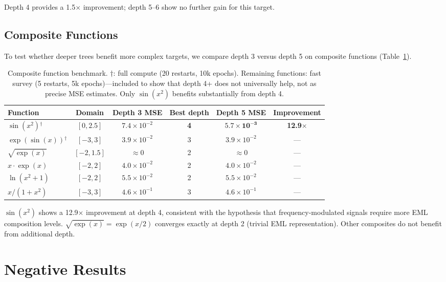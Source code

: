 \documentclass[11pt,a4paper]{article}
\begin{document}
Depth 4 provides a 1.5$\times$ improvement; depth 5--6 show no further gain for this target.

\subsection{Composite Functions}

To test whether deeper trees benefit more complex targets, we compare depth 3 versus depth 5 on composite functions (Table~\ref{tab:composite}).

\begin{table}[ht]
\centering
\caption{Composite function benchmark. $\dagger$: full compute (20 restarts, 10k epochs). Remaining functions: fast survey (5 restarts, 5k epochs)---included to show that depth 4+ does not universally help, not as precise MSE estimates. Only $\sin(x^2)$ benefits substantially from depth 4.}
\label{tab:composite}
\begin{tabular}{lccccc}
\toprule
Function & Domain & Depth 3 MSE & Best depth & Depth 5 MSE & Improvement \\
\midrule
$\sin(x^2)$$^\dagger$ & $[0, 2.5]$ & $7.4 \times 10^{-2}$ & \textbf{4} & $\mathbf{5.7 \times 10^{-3}}$ & \textbf{12.9$\times$} \\
$\exp(\sin(x))$$^\dagger$ & $[-3, 3]$ & $3.9 \times 10^{-2}$ & 3 & $3.9 \times 10^{-2}$ & --- \\
$\sqrt{\exp(x)}$ & $[-2, 1.5]$ & $\approx 0$ & 2 & $\approx 0$ & --- \\
$x \cdot \exp(x)$ & $[-2, 2]$ & $4.0 \times 10^{-2}$ & 2 & $4.0 \times 10^{-2}$ & --- \\
$\ln(x^2+1)$ & $[-2, 2]$ & $5.5 \times 10^{-2}$ & 2 & $5.5 \times 10^{-2}$ & --- \\
$x/(1+x^2)$ & $[-3, 3]$ & $4.6 \times 10^{-1}$ & 3 & $4.6 \times 10^{-1}$ & --- \\
\bottomrule
\end{tabular}
\end{table}

$\sin(x^2)$ shows a 12.9$\times$ improvement at depth 4, consistent with the hypothesis that frequency-modulated signals require more EML composition levels.
$\sqrt{\exp(x)} = \exp(x/2)$ converges exactly at depth 2 (trivial EML representation).
Other composites do not benefit from additional depth.

\section{Negative Results}
\label{sec:negative}
\end{document}
